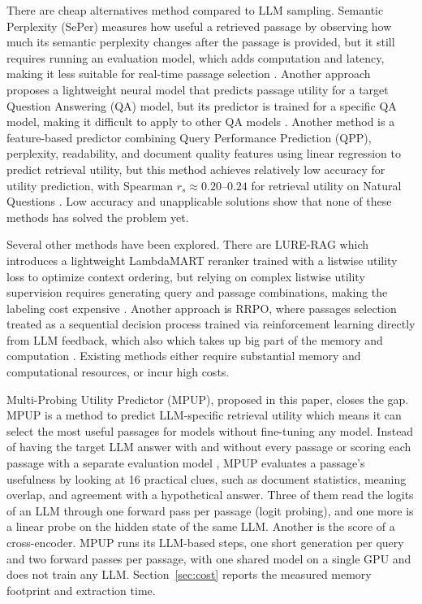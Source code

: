\documentclass[preprint,12pt,authoryear]{elsarticle}
\begin{document}
There are cheap alternatives method compared to LLM sampling. Semantic Perplexity (SePer) measures how useful a retrieved passage by observing how much its semantic perplexity changes after the passage is provided, but it still requires running an evaluation model, which adds computation and latency, making it less suitable for real-time passage selection \citep{dai2025}. Another approach proposes a lightweight neural model that predicts passage utility for a target Question Answering (QA) model, but its predictor is trained for a specific QA model, making it difficult to apply to other QA models \citep{perez2025}. Another method is a feature-based predictor combining Query Performance Prediction (QPP), perplexity, readability, and document quality features using linear regression to predict retrieval utility, but this method achieves relatively low accuracy for utility prediction, with Spearman $r_s \approx 0.20$--$0.24$ for retrieval utility on Natural Questions \citep{tian2026}. Low accuracy and unapplicable solutions show that none of these methods has solved the problem yet.

Several other methods have been explored. There are LURE-RAG which introduces a lightweight LambdaMART reranker trained with a listwise utility loss to optimize context ordering, but relying on complex listwise utility supervision requires generating query and passage combinations, making the labeling cost expensive \citep{chandra2026}. Another approach is RRPO, where passages selection treated as a sequential decision process trained via reinforcement learning directly from LLM feedback, which also which takes up big part of the memory and computation \citep{wu2026}. Existing methods either require substantial memory and computational resources, or incur high costs.

Multi-Probing Utility Predictor (MPUP), proposed in this paper, closes the gap. MPUP is a method to predict LLM-specific retrieval utility which means it can select the most useful passages for models without fine-tuning any model. Instead of having the target LLM answer with and without every passage \citep{zhang2025c} or scoring each passage with a separate evaluation model \citep{dai2025}, MPUP evaluates a passage’s usefulness by looking at 16 practical clues, such as document statistics, meaning overlap, and agreement with a hypothetical answer. Three of them read the logits of an LLM through one forward pass per passage (logit probing), and one more is a linear probe on the hidden state of the same LLM. Another is the score of a cross-encoder. MPUP runs its LLM-based steps, one short generation per query and two forward passes per passage, with one shared model on a single GPU and does not train any LLM. Section~\ref{sec:cost} reports the measured memory footprint and extraction time.
\end{document}
